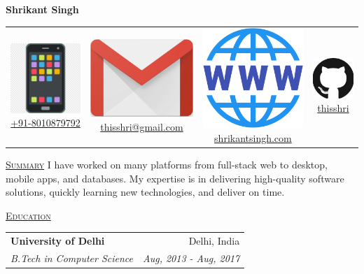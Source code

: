 \documentclass[11pt, a4paper]{article}
\begin{document}
\begin{center}
    \textbf{{\huge Shrikant Singh}}
\end{center}
\begin{center}
    \begin{tabular}{ c | c | c | c}
        \includegraphics[height=.018\textwidth]{phone} \href{tel:+918010879792}{+91-8010879792} &
        \includegraphics[height=.018\textwidth]{gmail} \href{mailto:thisshri@gmail.com} {thisshri@gmail.com} &
        \includegraphics[height=.018\textwidth]{web} \href{https://shrikantsingh.com} {shrikantsingh.com}&
        \includegraphics[height=.018\textwidth]{github} \href{https://github.com/thisshri} {thisshri} \\
    \end{tabular}
\end{center}

\begin{flushleft}
    \uline{\textsc{\large{Summary}}\hfill}
    \newline
    \newline
    I have worked on many platforms from full-stack web to desktop, mobile apps, and databases. My expertise is in delivering high-quality software solutions, quickly learning new technologies, and deliver on time.
    \newline
\end{flushleft}

\begin{flushleft}
    \uline{\textsc{\large{Education}}\hfill}
    \newline
    \newline
    \setlength\tabcolsep{0pt}
    \begin{tabularx}{\textwidth}{X r}
        \large{\textbf{University of Delhi}} & Delhi, India \\
        \textit{B.Tech in Computer Science} & \textit{Aug, 2013 - Aug, 2017} \\
    \end{tabularx}
    \newline
\end{flushleft}
\end{document}

